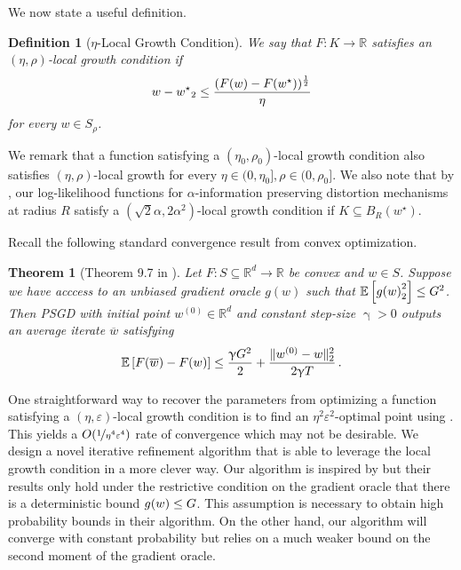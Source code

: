 \documentclass[11pt,letterpaper]{article}
\newcommand{\sset}{\subseteq}
\theoremstyle{plain}
\newtheorem{theorem}{Theorem}[section]
\newtheorem{definition}{Definition}
\theoremstyle{definition}
\theoremstyle{remark}
\newcommand{\insquare}[1]{\ensuremath{\left[#1\right]}}
\newcommand{\snorm}[1]{\ensuremath{\ensuremath{\| #1 \|}}}
\let\norm\relax
\newcommand{\norm}[1]{\ensuremath{\left\lVert #1 \right\rVert}}
\newcommand{\R}{\mathbb{R}}
\newcommand{\E}{\operatornamewithlimits{\mathbb{E}}}
\newcommand{\nfrac}[2]{\nicefrac{#1}{#2}}
\newcommand{\eps}{\varepsilon}
\renewcommand{\bar}{\overline}
\renewcommand{\gamma}{\upgamma}
\begin{document}
{{{We now state a useful definition.
\begin{definition}[$\eta$-Local Growth Condition]\label{def:local-growth}
    We say that $F\colon K\to \R$ satisfies an \emph{$(\eta, \rho)$-local growth condition} if
    \[
        \norm{w - w^\star}_2
        \leq \frac{(F(w) - F(w^\star))^\frac12}{\eta}
    \]
    for every $w\in S_{\rho}$.
\end{definition}
We remark that a function satisfying a $(\eta_0, \rho_0)$-local growth condition
also satisfies $(\eta, \rho)$-local growth for every $\eta\in (0, \eta_0], \rho\in (0, \rho_0]$.
We also note that by ,
our log-likelihood functions for $\alpha$-information preserving distortion mechanisms at radius $R$ satisfy a $(\sqrt2 \alpha, 2{\alpha^2})$-local growth condition
{if $K\sset B_R(w^\star)$}.

Recall the following standard convergence result from convex optimization.
\begin{theorem}[Theorem 9.7 in \cite{garrigos2023handbook}]\label{thm:SGD-convergence}
    Let $F\colon S\sset \R^d\to \R$ be convex and $w\in S$.
    Suppose we have acccess to an unbiased gradient oracle $g(w)$ such that $\E\insquare{\norm{g(w)}_2^2}\leq G^2$.
    Then PSGD with initial point $w^{(0)}\in \R^d$
    and constant step-size $\gamma > 0$ 
    outputs an average iterate $\bar w$ satisfying
    \[
        \E\insquare{F(\bar w) - F(w)}
        \leq \frac{\gamma G^2}{2} + \frac{\snorm{w^{(0)} - w}_2^2}{2\gamma T}\,.
    \]
\end{theorem}
One straightforward way to recover the parameters from optimizing a function satisfying a $(\eta, \eps)$-local growth condition
is to find an $\eta^2\eps^2$-optimal point using .
This yields a $O(\nfrac1{\eta^4 \eps^4})$ rate of convergence which may not be desirable.
We design a novel iterative refinement algorithm that is able to leverage the local growth condition in a more clever way.
Our algorithm is inspired by \citet{xu2019accelerate} but their results only hold under the restrictive condition on the gradient oracle that there is a deterministic bound $\norm{g(w)}\leq G$.
This assumption is necessary to obtain high probability bounds in their algorithm.
On the other hand,
our algorithm will converge with constant probability
but relies on a much weaker bound on the second moment of the gradient oracle.

}}}
\end{document}
